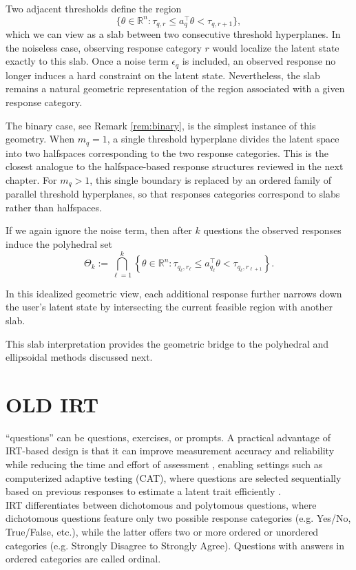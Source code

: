 \documentclass{article}
\begin{document}
Two adjacent thresholds define the region
\begin{equation*}
\{\theta \in \mathbb R^n : \tau_{q,r} \le a_q^\top \theta < \tau_{q,r+1}\},
\label{eq:slab_region}
\end{equation*}
which we can view as a slab between two consecutive threshold hyperplanes. In the noiseless
case, observing response category $r$ would localize the latent state exactly to
this slab. Once a noise term $\epsilon_q$ is included, an observed response no longer induces a
hard constraint on the latent state. Nevertheless, the slab remains a natural geometric representation of the
region associated with a given response category.

The binary case, see Remark \ref{rem:binary}, is the simplest instance of this geometry. When
$m_q=1$, a single threshold hyperplane divides the latent space into two halfspaces
corresponding to the two response categories. This is the closest analogue to the
halfspace-based response structures reviewed in the next chapter. For
$m_q>1$, this single boundary is replaced by an ordered family of parallel threshold
hyperplanes, so that responses categories correspond to slabs rather
than halfspaces.

If we again ignore the noise term, then after $k$ questions the
observed responses induce the polyhedral set
\begin{equation}
\Theta_k
:=
\bigcap_{\ell=1}^k
\left\{
\theta \in \mathbb R^n :
\tau_{q_\ell,r_{\ell}} \le a_{q_\ell}^\top \theta < \tau_{q_{\ell},r_{\ell+1}}
\right\}.
\label{eq:slabs}
\end{equation}

In this idealized geometric view, each additional response further narrows down the
user's latent state by intersecting the current feasible region with another slab.

This slab interpretation provides the geometric bridge to the polyhedral and
ellipsoidal methods discussed next.

\chapter{OLD IRT}\label{chapter:IRT}

 
“questions” can be questions, exercises, or prompts. A practical advantage of IRT-based design is that it can improve measurement accuracy and reliability while reducing the time and effort of assessment \cite{edelenReeve2007irt}, enabling settings such as computerized adaptive testing (CAT), where questions are selected sequentially based on previous responses to estimate a latent trait efficiently \cite{CAT1,CAT2}.\\
IRT differentiates between dichotomous and polytomous questions, where dichotomous questions feature only two possible response categories (e.g. Yes/No, True/False, etc.), while the latter offers two or more ordered or unordered categories (e.g. Strongly Disagree to Strongly Agree). Questions with answers in ordered categories are called ordinal. \\
\end{document}

